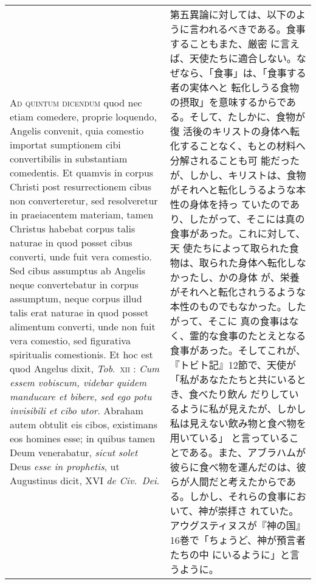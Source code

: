 \documentclass[10pt]{jsarticle} %
\begin{document}
\begin{longtable}{p{21em}p{21em}}
\\


{\scshape Ad quintum dicendum} quod nec etiam comedere,
proprie loquendo, Angelis convenit, quia comestio importat sumptionem
cibi convertibilis in substantiam comedentis. Et quamvis in corpus
Christi post resurrectionem cibus non converteretur, sed resolveretur in
praeiacentem materiam, tamen Christus habebat corpus talis naturae in
quod posset cibus converti, unde fuit vera comestio. Sed cibus assumptus
ab Angelis neque convertebatur in corpus assumptum, neque corpus illud
talis erat naturae in quod posset alimentum converti, unde non fuit vera
comestio, sed figurativa spiritualis comestionis. Et hoc est quod
Angelus dixit, {\itshape Tob}.~{\scshape xii} : {\itshape Cum essem vobiscum, videbar quidem manducare et
bibere, sed ego potu invisibili et cibo utor}. Abraham autem obtulit eis
cibos, existimans eos homines esse; in quibus tamen Deum venerabatur,
{\itshape sicut solet} Deus {\itshape esse in prophetis}, ut Augustinus dicit, XVI {\itshape de
Civ.~Dei}.


&

第五異論に対しては、以下のように言われるべきである。食事することもまた、厳密
 に言えば、天使たちに適合しない。なぜなら、「食事」は、「食事する者の実体へと
 転化しうる食物の摂取」を意味するからである。そして、たしかに、食物が復
 活後のキリストの身体へ転化することなく、もとの材料へ分解されることも可
 能だったが、しかし、キリストは、食物がそれへと転化しうるような本性の身体を持っ
 ていたのであり、したがって、そこには真の食事があった。これに対して、天
 使たちによって取られた食物は、取られた身体へ転化しなかったし、かの身体
 が、栄養がそれへと転化されうるような本性のものでもなかった。したがって、そこに
 真の食事はなく、霊的な食事のたとえとなる食事があった。そしてこれが、
 『トビト記』12節で、天使が「私があなたたちと共にいるとき、食べたり飲ん
 だりしているように私が見えたが、しかし私は見えない飲み物と食べ物を用いている」
 と言っていることである。また、アブラハムが彼らに食べ物を運んだのは、彼
 らが人間だと考えたからである。しかし、それらの食事において、神が崇拝さ
 れていた。アウグスティヌスが『神の国』16巻で「ちょうど、神が預言者たちの中
 にいるように」と言うように。

\\




\end{longtable}
\end{document}
